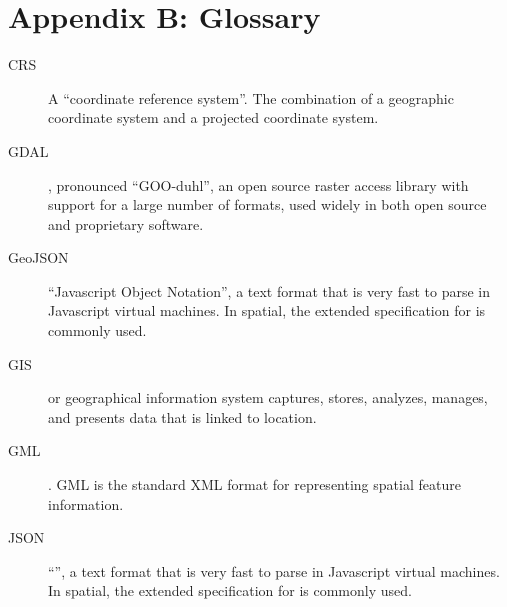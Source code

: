 \documentclass[a4paper,11pt,english]{sphinxmanual}
\begin{document}
\chapter{Appendix B: Glossary}
\label{\detokenize{glossary:appendix-b-glossary}}\label{\detokenize{glossary:glossary}}\label{\detokenize{glossary::doc}}\begin{description}
\item[{CRS\label{\detokenize{glossary:term-crs}}}] \leavevmode
A “coordinate reference system”. The combination of a geographic coordinate system and a projected coordinate system.

\item[{GDAL\label{\detokenize{glossary:term-gdal}}}] \leavevmode
{}, pronounced “GOO-duhl”, an open source raster access library with support for a large number of formats, used widely in both open source and proprietary software.

\item[{GeoJSON\label{\detokenize{glossary:term-geojson}}}] \leavevmode
“Javascript Object Notation”, a text format that is very fast to parse in Javascript virtual machines. In spatial, the extended specification for  is commonly used.

\item[{GIS\label{\detokenize{glossary:term-gis}}}] \leavevmode
{} or geographical information system captures, stores, analyzes, manages, and presents data that is linked to location.

\item[{GML\label{\detokenize{glossary:term-gml}}}] \leavevmode
{}.  GML is the {\hyperref[\detokenize{glossary:term-ogc}]{}} standard XML format for representing spatial feature information.

\item[{JSON\label{\detokenize{glossary:term-json}}}] \leavevmode
“”, a text format that is very fast to parse in Javascript virtual machines. In spatial, the extended specification for  is commonly used.


\end{description}
\end{document}
